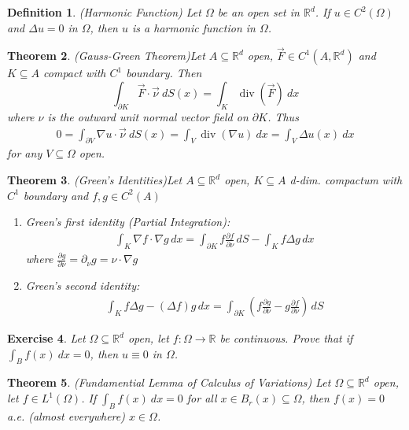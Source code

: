 \documentclass{report}
\theoremstyle{tommy}
\newtheorem{defn}{Definition}
\newtheorem{thm}[defn]{Theorem}
\newtheorem{ex}[defn]{Exercise}
\renewcommand\div{\operatorname{div}}
\begin{document}
\begin{defn} (Harmonic Function)
  Let \(\Omega\) be an open set in \(\mathbb{R}^d\). If \(u \in C^2(\Omega)\) and \(\Delta u = 0\) in \(\Omega\), then \(u\) is a harmonic function in \(\Omega\).
\end{defn}

\begin{thm} (Gauss-Green Theorem)\label{gauss-green}
  Let \(A \subseteq \mathbb{R}^d\) open, \(\vec{F} \in C^1(A, \mathbb{R}^d)\) and \(K \subseteq A\) compact with \(C^1\) boundary. Then
  \[ \int_{\partial K} \vec{F} \cdot \vec{\nu}\ dS(x) = \int_K \div(\vec{F})\ dx \]
  where \(\nu\) is the outward unit normal vector field on \(\partial K\).
Thus
\begin{align*}
  0 = \int_{\partial V} \nabla u \cdot \vec{\nu}\ dS(x)
  = \int_V \div(\nabla u) \ dx
  = \int_V \Delta u(x) \ dx
\end{align*}
for any \(V \subseteq \Omega \) open.
\end{thm}


\begin{thm}(Green's Identities)\label{green-identities}
  Let \(A \subseteq \mathbb{R}^d\) open, \(K \subseteq A\) d-dim. compactum with \(C^1\) boundary and \(f, g \in C^2(A)\)
  \begin{enumerate}
    \item Green's first identity (Partial Integration): \begin{align*}
      \int_K \nabla f \cdot \nabla g \, dx = \int_{\partial K} f \frac{\partial f}{\partial \nu} \, dS - \int_K f \Delta g \, dx
    \end{align*}
    where \(\frac{\partial g}{\partial \nu} = \partial_\nu g = \nu \cdot \nabla g\)
    \item Green's second identity: \begin{align*}
      \int_K f \Delta g - (\Delta f) g \, dx = \int_{\partial K} \left(f \frac{\partial g}{\partial \nu} - g \frac{\partial f}{\partial \nu}\right) \, dS
    \end{align*}
  \end{enumerate}
\end{thm}

\begin{ex}
  Let \(\Omega \subseteq \mathbb{R}^d\) open, let \(f: \Omega \to \mathbb{R}\) be continuous. Prove that if \( \int_B f(x) \ dx = 0 \), then \( u \equiv 0 \) in \(\Omega\).
\end{ex}

\begin{thm} (Fundamential Lemma of Calculus of Variations)
  Let \(\Omega \subseteq \mathbb{R}^d\) open, let \(f \in L^1(\Omega)\). If 
  \(\int_B f(x) \ dx = 0\) for all \(x \in B_r(x) \subseteq \Omega\), then \(f(x) = 0\) a.e. (almost everywhere) \(x \in \Omega\).
\end{thm}
\end{document}
